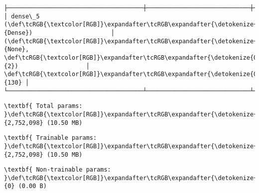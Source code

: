 \documentclass[11pt]{article}
\begin{document}
\begin{Verbatim}[commandchars=\\\{\}]
├──────────────────────────────────────┼─────────────────────────────┼─────────────────┤
│ dense\_5 (\def\tcRGB{\textcolor[RGB]}\expandafter\tcRGB\expandafter{\detokenize{0,135,255}}{Dense})                      │ (\def\tcRGB{\textcolor[RGB]}\expandafter\tcRGB\expandafter{\detokenize{0,215,255}}{None}, \def\tcRGB{\textcolor[RGB]}\expandafter\tcRGB\expandafter{\detokenize{0,175,0}}{2})                   │             \def\tcRGB{\textcolor[RGB]}\expandafter\tcRGB\expandafter{\detokenize{0,175,0}}{130} │
└──────────────────────────────────────┴─────────────────────────────┴─────────────────┘

    \end{Verbatim}

    
    
    \begin{Verbatim}[commandchars=\\\{\}]
\textbf{ Total params: }\def\tcRGB{\textcolor[RGB]}\expandafter\tcRGB\expandafter{\detokenize{0,175,0}}{2,752,098} (10.50 MB)

    \end{Verbatim}

    
    
    \begin{Verbatim}[commandchars=\\\{\}]
\textbf{ Trainable params: }\def\tcRGB{\textcolor[RGB]}\expandafter\tcRGB\expandafter{\detokenize{0,175,0}}{2,752,098} (10.50 MB)

    \end{Verbatim}

    
    
    \begin{Verbatim}[commandchars=\\\{\}]
\textbf{ Non-trainable params: }\def\tcRGB{\textcolor[RGB]}\expandafter\tcRGB\expandafter{\detokenize{0,175,0}}{0} (0.00 B)

    \end{Verbatim}
\end{document}
